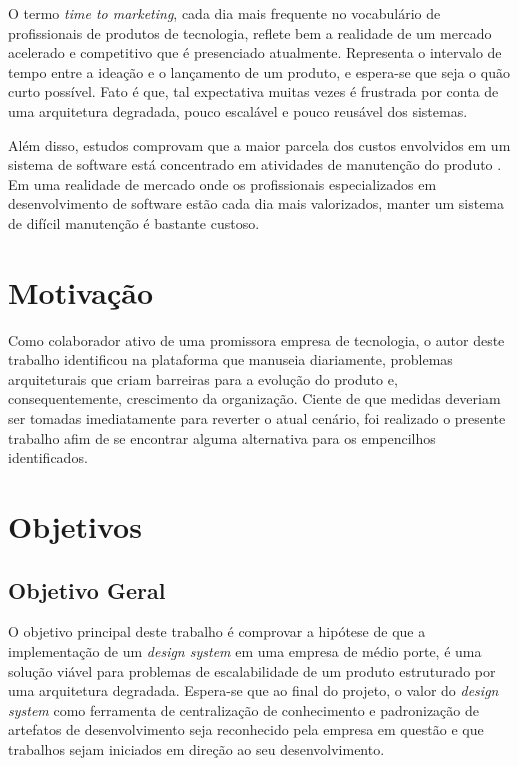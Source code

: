 O termo \textit{time to marketing}, cada dia mais frequente no vocabulário de profissionais de produtos de tecnologia, reflete bem a realidade de um mercado acelerado e competitivo que é presenciado atualmente. Representa o intervalo de tempo entre a ideação e o lançamento de um produto, e espera-se que seja o quão curto possível. Fato é que, tal expectativa muitas vezes é frustrada por conta de uma arquitetura degradada, pouco escalável e pouco reusável dos sistemas.

Além disso, estudos comprovam que a maior parcela dos custos envolvidos em um sistema de software está concentrado em atividades de manutenção do produto \cite{softwareCost}. Em uma realidade de mercado onde os profissionais especializados em desenvolvimento de software estão cada dia mais valorizados, manter um sistema de difícil manutenção é bastante custoso.

\section{Motivação}
\label{sec:motivacao}

Como colaborador ativo de uma promissora empresa de tecnologia, o autor deste trabalho identificou na plataforma que manuseia diariamente, problemas arquiteturais que criam barreiras para a evolução do produto e, consequentemente, crescimento da organização. Ciente de que medidas deveriam ser tomadas imediatamente para reverter o atual cenário, foi realizado o presente trabalho afim de se encontrar alguma alternativa para os empencilhos identificados.

\section{Objetivos}
\label{sec:objetivos}

\subsection{Objetivo Geral}

O objetivo principal deste trabalho é comprovar a hipótese de que a implementação de um \textit{design system} em uma empresa de médio porte, é uma solução viável para problemas de escalabilidade de um produto estruturado por uma arquitetura degradada. Espera-se que ao final do projeto, o valor do \textit{design system} como ferramenta de centralização de conhecimento e padronização de artefatos de desenvolvimento seja reconhecido pela empresa em questão e que trabalhos sejam iniciados em direção ao seu desenvolvimento.

